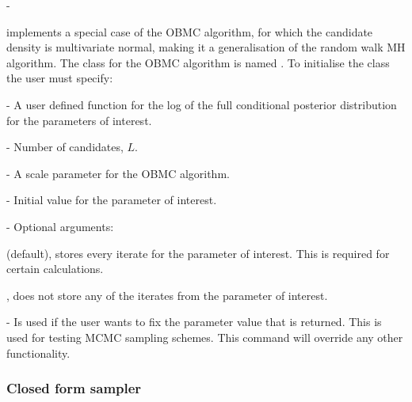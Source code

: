 -\documentclass[article]{jss}
\begin{document}
 implements a special case of the OBMC algorithm, for
which the candidate density is multivariate normal, making it a
generalisation of the random walk MH algorithm. The class for the OBMC
algorithm is named . To initialise the class the user must
specify:
\begin{description}
\item {} - A user defined function for the log of the full
  conditional posterior distribution for the parameters of interest.
\item {} - Number of candidates, $L$.
\item {} - A scale parameter for the OBMC algorithm.
\item {} - Initial value for the parameter of interest. 
\item {} - Optional arguments:

  \begin{description}
  \item {}
    \begin{description}
    \item {} (default), stores every iterate for the
      parameter of interest. This is required for certain
      calculations.
    \item {}, does not store any of the iterates from the
      parameter of interest.
      \end{description}
    \item {} - Is used if the user wants to fix
      the parameter value that is returned. This is used for testing
      MCMC sampling schemes.  This command will override any other
      functionality.
  \end{description}
\end{description}

\subsubsection{Closed form sampler}
\end{document}
